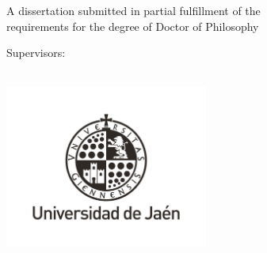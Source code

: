 \begin{center}
    \null\vspace{8mm}
    
    \libertineNormalCapital
    {
        \huge 
        \textcolor{redThesis}{
            \textls[30]
            {
                \titleEnglish
            }
        }
    
        \vspace{5mm}
        
        \Large
        \authorship
    }
    
    \vspace{5mm}
    
    \libertineNormal
    {
        \Large 
        A dissertation submitted in partial fulfillment of the\\
        \minorSpacing
        requirements for the degree of Doctor of Philosophy
    }
    
    \vspace{8mm}
    
    {
       \libertineNormalCapital
       \Large 
       Supervisors:\\
    
       \libertineNormal
       \mainSupervisor\\
       \minorSpacing
       \secondSupervisor
    }
    
    \vspace{15mm}
    
    \includegraphics[width=0.5\textwidth]{images/Uja/UjaPhDBlack.jpg}
    
    \vspace{3mm}
    
    {
        \libertineNormal
        \Large 
        \department\\
        \minorSpacing
        \polytechnicSchool\\
        \minorSpacing
        \university\\
    
        \vspace{12mm}
        \dateDissertation
    }
    
    \libertineNormal
    \newpage
\end{center}